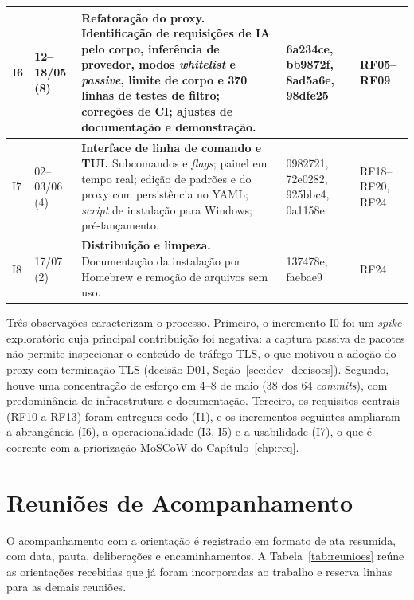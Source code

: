 {\begin{longtable}{|p{0.9cm}|p{2.1cm}|p{6.6cm}|p{2.6cm}|p{1.6cm}|}
I6 & 12--18/05 (8) & \textbf{Refatoração do proxy.} Identificação de requisições de IA pelo corpo, inferência de provedor, modos \textit{whitelist} e \textit{passive}, limite de corpo e 370 linhas de testes de filtro; correções de CI; ajustes de documentação e demonstração. & 6a234ce, bb9872f, 8ad5a6e, 98dfe25 & RF05--RF09 \\ \hline
I7 & 02--03/06 (4) & \textbf{Interface de linha de comando e TUI.} Subcomandos e \textit{flags}; painel em tempo real; edição de padrões e do proxy com persistência no YAML; \textit{script} de instalação para Windows; pré-lançamento. & 0982721, 72e0282, 925bbc4, 0a1158e & RF18--RF20, RF24 \\ \hline
I8 & 17/07 (2) & \textbf{Distribuição e limpeza.} Documentação da instalação por Homebrew e remoção de arquivos sem uso. & 137478e, faebae9 & RF24 \\ \hline
\end{longtable}
}
\noindent{}

Três observações caracterizam o processo. Primeiro, o incremento I0 foi um \textit{spike} exploratório cuja principal contribuição foi negativa: a captura passiva de pacotes não permite inspecionar o conteúdo de tráfego TLS, o que motivou a adoção do proxy com terminação TLS (decisão D01, Seção~\ref{sec:dev_decisoes}). Segundo, houve uma concentração de esforço em 4--8 de maio (38 dos 64 \textit{commits}), com predominância de infraestrutura e documentação. Terceiro, os requisitos centrais (RF10 a RF13) foram entregues cedo (I1), e os incrementos seguintes ampliaram a abrangência (I6), a operacionalidade (I3, I5) e a usabilidade (I7), o que é coerente com a priorização MoSCoW do Capítulo~\ref{chp:req}.

\section{Reuniões de Acompanhamento}
\label{sec:dev_reunioes}

O acompanhamento com a orientação é registrado em formato de ata resumida, com data, pauta, deliberações e encaminhamentos. A Tabela~\ref{tab:reunioes} reúne as orientações recebidas que já foram incorporadas ao trabalho e reserva linhas para as demais reuniões.


